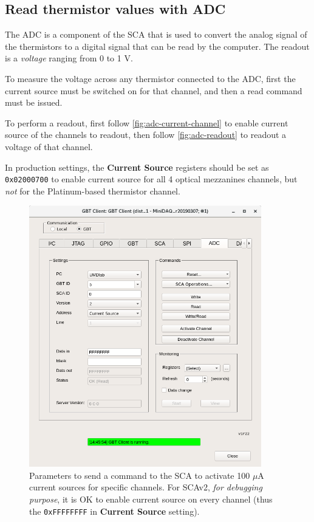 \subsection{Read thermistor values with ADC}
The ADC is a component of the SCA that is used to convert the analog signal of
the thermistors to a digital signal that can be read by the computer.
The readout is a \emph{voltage} ranging from 0 to 1 V.

To measure the voltage across any thermistor connected to the ADC, first the
current source must be switched on for that channel, and then a read command
must be issued.

To perform a readout, first follow \autoref{fig:adc-current-channel} to enable
current source of the channels to readout,
then follow \autoref{fig:adc-readout} to readout a voltage of that channel.

In production settings, the \textbf{Current Source} registers should be set as
\texttt{0x02000700} to enable current source for all 4 optical mezzanines
channels, but \emph{not} for the Platinum-based thermistor channel.

\begin{figure}[ht]
    \centering
    \includegraphics[width=0.9\textwidth]{res/gbt_client_adc_readout_currentsource.png}
    \caption{
        Parameters to send a command to the SCA to activate 100 $\mu$A current
        sources for specific channels.
        For SCAv2, \emph{for debugging purpose}, it is OK to enable current
        source on every channel (thus the \texttt{0xFFFFFFFF} in
        \textbf{Current Source} setting).
    }
    \label{fig:adc-current-channel}
\end{figure}

